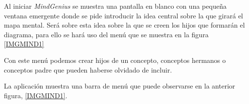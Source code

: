 \documentclass[11pt,a4paper,spanish,twoside]{report}
\begin{document}
        Al iniciar \emph{MindGenius} se muestra una pantalla en blanco con
        una pequeña ventana emergente donde se pide introducir la idea
        central sobre la que girará el mapa mental. Será sobre esta idea
        sobre la que se creen los hijos que formarán el diagrama, para ello
        se hará uso del menú que se muestra en la figura \ref{IMGMIND1}


        Con este menú podemos crear hijos de un concepto, conceptos
        hermanos o conceptos padre que pueden haberse olvidado de incluir.

        La aplicación muestra una barra de menú que puede observarse en la
        anterior figura, \ref{IMGMIND1}. 
        
\end{document}
